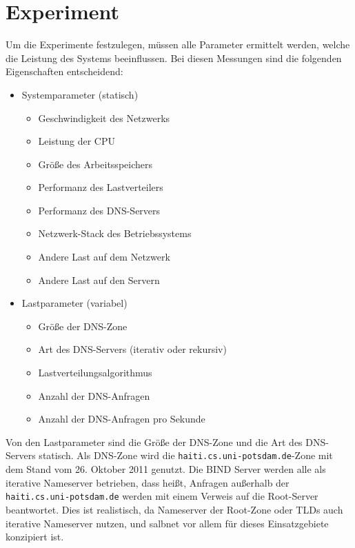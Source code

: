 \documentclass[a4paper, 12pt, BCOR10mm, DIV12, toc=bibliography, toc=listof, german]{scrbook}
\begin{document}

		\section{Experiment} %
		\label{sec:experiment}


			Um die Experimente festzulegen, müssen alle Parameter ermittelt werden, welche die Leistung
			des Systems beeinflussen. Bei diesen Messungen sind die folgenden Eigenschaften entscheidend:

			\begin{itemize}
				\item Systemparameter (statisch)
					\begin{itemize}
						\item Geschwindigkeit des Netzwerks
						\item Leistung der CPU
						\item Größe des Arbeitsspeichers
						\item Performanz des Lastverteilers
						\item Performanz des DNS-Servers
						\item Netzwerk-Stack des Betriebssystems
						\item Andere Last auf dem Netzwerk
						\item Andere Last auf den Servern
					\end{itemize}
				\item Lastparameter (variabel)
					\begin{itemize}
						\item Größe der DNS-Zone
						\item Art des DNS-Servers (iterativ oder rekursiv)
						\item Lastverteilungsalgorithmus
						\item Anzahl der DNS-Anfragen
						\item Anzahl der DNS-Anfragen pro Sekunde
					\end{itemize}
			\end{itemize}

			Von den Lastparameter sind die Größe der DNS-Zone und die Art des DNS-Servers statisch. Als
			DNS-Zone wird die \texttt{haiti.cs.uni-potsdam.de}-Zone mit dem Stand vom 26.  Oktober 2011
			genutzt. Die BIND Server werden alle als iterative Nameserver betrieben, dass heißt, Anfragen
			außerhalb der \texttt{haiti.cs.uni-potsdam.de} werden mit einem Verweis auf die Root-Server
			beantwortet. Dies ist realistisch, da Nameserver der Root-Zone oder TLDs auch iterative
			Nameserver nutzen, und salbnet vor allem für dieses Einsatzgebiete konzipiert ist.
\end{document}
